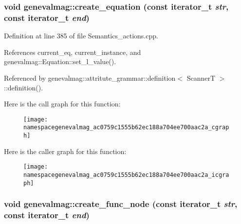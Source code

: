\hypertarget{namespacegenevalmag_ac0759c1555b62ec188a704ee700aac2a}{
\subsubsection[{create\_\-equation}]{\setlength{\rightskip}{0pt plus 5cm}void genevalmag::create\_\-equation (const iterator\_\-t {\em str}, \/  const iterator\_\-t {\em end})}}
\label{namespacegenevalmag_ac0759c1555b62ec188a704ee700aac2a}


Definition at line 385 of file Semantics\_\-actions.cpp.



References current\_\-eq, current\_\-instance, and genevalmag::Equation::set\_\-l\_\-value().



Referenced by genevalmag::attritute\_\-grammar::definition$<$ ScannerT $>$::definition().



Here is the call graph for this function:\nopagebreak
\begin{figure}[H]
\begin{center}
\leavevmode
\texttt{[image: namespacegenevalmag\_ac0759c1555b62ec188a704ee700aac2a\_cgraph]}
\end{center}
\end{figure}




Here is the caller graph for this function:\nopagebreak
\begin{figure}[H]
\begin{center}
\leavevmode
\texttt{[image: namespacegenevalmag\_ac0759c1555b62ec188a704ee700aac2a\_icgraph]}
\end{center}
\end{figure}


\hypertarget{namespacegenevalmag_a2f41a8b96eb7d5bdca16a4924dcd020f}{
\subsubsection[{create\_\-func\_\-node}]{\setlength{\rightskip}{0pt plus 5cm}void genevalmag::create\_\-func\_\-node (const iterator\_\-t {\em str}, \/  const iterator\_\-t {\em end})}}
\label{namespacegenevalmag_a2f41a8b96eb7d5bdca16a4924dcd020f}


